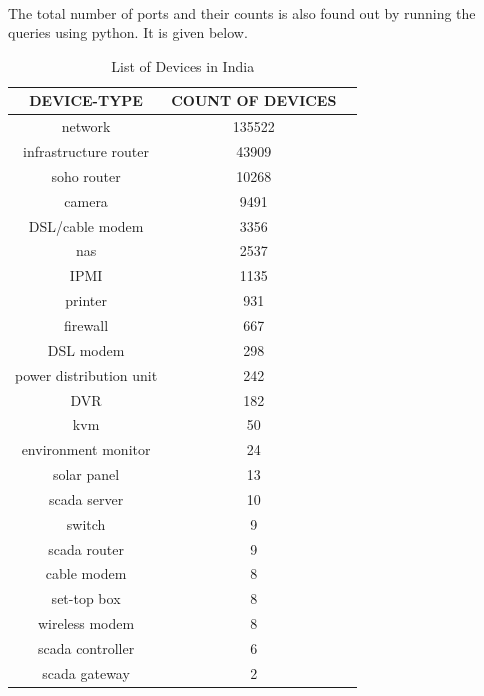 \documentclass{report}
\begin{document}


\paragraph{}
The total number of ports and their counts is also found out by running the queries using python. It is given below.



\begin{table}[h!]
\begin{center}
\begin{tabular}{ |c|c|c| } 
 \hline
 \textbf{DEVICE-TYPE} & \textbf{COUNT OF DEVICES}\\
 \hline
 network & 135522  \\
  \hline
 infrastructure router & 43909  \\
  \hline
 soho router & 10268  \\
  \hline
 camera & 9491  \\
  \hline
 DSL/cable modem & 3356  \\
  \hline
 nas & 2537  \\
  \hline
 IPMI & 1135  \\
  \hline
 printer	 & 931  \\
  \hline
 firewall & 667  \\
  \hline
 DSL modem & 298  \\
  \hline
 power distribution unit & 242  \\
 \hline
 DVR & 182  \\
 \hline
 kvm & 50  \\
 \hline
 environment monitor	 & 24  \\
 \hline
 solar panel & 13  \\
 \hline
 scada server	 & 10  \\
 \hline
 switch & 9  \\
 \hline
 scada router & 9  \\
 \hline
 cable modem	 & 8  \\
 \hline
 set-top box & 8  \\
 \hline
 wireless modem & 8  \\
 \hline
 scada controller & 6  \\
 \hline
 scada gateway & 2  \\
 \hline
\end{tabular}
\caption{List of Devices in India}
\end{center}
\end{table}
\end{document}
